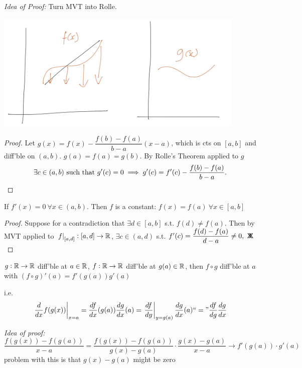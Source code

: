 \emph{Idea of Proof:} Turn MVT into Rolle. 

\begin{center}
\includegraphics[width = 12cm]{mvt2.jpg}
\end{center}

\begin{proof}
Let $g(x) = f(x) - \dfrac{f(b) - f(a)}{b-a}(x-a)$, which is cts on $[a,b]$ and diff'ble on $(a,b)$. $g(a) = f(a) = g(b)$. By Rolle's Theorem applied to $g$
\[\exists c \in (a,b)\text{ such that }g'(c) = 0 \implies g'(c) = f'(c) - \dfrac{f(b) - f(a)}{b-a}.\qedhere\]	
\end{proof}\vspace*{5pt}

\begin{corollary}
If $f'(x) = 0~\forall x \in (a,b)$. Then $f$ is a constant: $f(x) = f(a)~\forall x \in [a,b]$
\end{corollary}
\begin{proof}
Suppose for a contradiction that $\exists d \in[a,b]$ s.t. $f(d) \neq f(a)$. Then by MVT applied to $\left. f\right|_{[a,d]}: [a,d] \to \mathbb{R}$, $\exists c\in(a,d)$ s.t. $f'(c) = \dfrac{f(d) - f(a)}{d-a} \neq 0,~\mathsf{X}\mkern-8.5mu\mathsf{X}$	
\end{proof}


\begin{theorem} $g: \mathbb{R} \to \mathbb{R}$ diff'ble at $a \in \mathbb{R}$, $f: \mathbb{R} \to \mathbb{R}$ diff'ble at $g(a) \in \mathbb{R}$, then $f \circ g$ diff'ble at $a$ with $(f\circ g)'(a) =f'(g(a))g'(a)$
\end{theorem}

i.e. \[\left.\frac{d}{dx} f(g(x))\right|_{x=a} = \frac{df}{dx} (g(a)) \frac{dg}{dx}(a) = \left.\frac{df}{dy}\right|_{y=g(a)}\frac{dg}{dx}(a) ``=" \frac{df}{dg}\frac{dg}{dx}\]

\emph{Idea of proof:} 
\[\frac{f(g(x))-f(g(a))}{x-a} = \frac{f(g(x)) - f(g(a))}{g(x) -g(a)}\cdot\frac{g(x)-g(a)}{x-a} \to f'(g(a))\cdot g'(a)\]
problem with this is that $g(x) - g(a)$ might be zero

